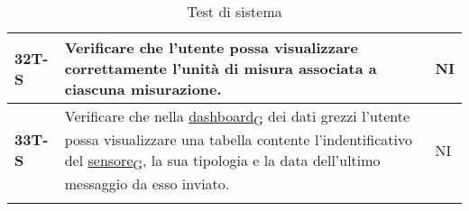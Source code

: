 \begin{longtable}{|>{\raggedright\arraybackslash}m{}|>{\raggedright\arraybackslash}m{}|>{\raggedright\arraybackslash}m{}|}
	\hline
	\textbf{32T-S}  & Verificare che l’utente possa visualizzare correttamente l’unità di misura associata a ciascuna misurazione.                                                                                     & NI             \\
	\hline
	\textbf{33T-S}  & Verificare che nella \href{https://7last.github.io/docs/rtb/documentazione-interna/glossario\#dashboard}{dashboard\textsubscript{G}} dei dati grezzi l'utente possa visualizzare una tabella contente l'indentificativo del \href{https://7last.github.io/docs/rtb/documentazione-interna/glossario\#sensore}{sensore\textsubscript{G}}, la sua tipologia e la data dell'ultimo messaggio da esso inviato. & NI             \\
	\hline
	\caption{Test di sistema}
\end{longtable}

